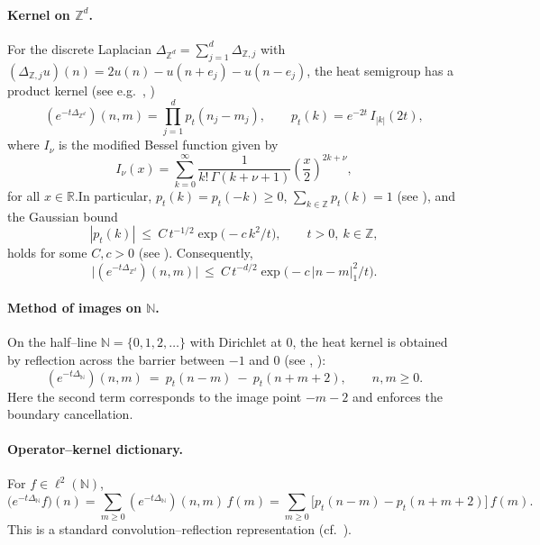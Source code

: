 \documentclass[10pt]{amsart}
\newcommand{\R}{{\mathbb{R}}}
\newcommand{\1}{{\mathbb{I}}}
\numberwithin{equation}{section}
\begin{document}
\paragraph{Kernel on $\mathbb{Z}^d$.}
For the discrete Laplacian $\Delta_{\mathbb{Z}^d}= \sum_{j=1}^d \Delta_{\mathbb{Z},j}$
with $(\Delta_{\mathbb{Z},j} u)(n)=2u(n)-u(n+e_j)-u(n-e_j)$, the heat semigroup
has a product kernel (see e.g.~\cite[Sec.~I.9]{Spitzer1976}, \cite{LawlerLimic2010})
\[
(e^{-t\Delta_{\mathbb{Z}^d}})(n,m)
= \prod_{j=1}^d p_t(n_j-m_j),
\qquad
p_t(k)=e^{-2t}\,I_{|k|}(2t),
\]
where $I_\nu$ is the modified Bessel function given by \[
I_\nu(x)
= \sum_{k=0}^{\infty}
\frac{1}{k!\,\Gamma(k+\nu+1)}
\left( \frac{x}{2} \right)^{2k+\nu},
\]
for all $x\in\R$.In particular,
$p_t(k)=p_t(-k)\ge0$, $\sum_{k\in\mathbb{Z}}p_t(k)=1$ (see \cite{Woess2000}),
and the Gaussian bound
\begin{equation}\label{eq:pt-Gauss}
|p_t(k)|\ \le\ C\,t^{-1/2}\exp\!\big(-c\,k^2/t\big),\qquad t>0,\ k\in\mathbb{Z},
\end{equation}
holds for some $C,c>0$ (see \cite{CarlenKusuokaStroock1987,Delmotte1999}).
Consequently,
\[
\big|(e^{-t\Delta_{\mathbb{Z}^d}})(n,m)\big|
\ \le\ C\,t^{-d/2}\exp\!\big(-c\,|n-m|_1^2/t\big).
\]

\paragraph{Method of images on $\mathbb{N}$.}
On the half--line $\mathbb{N}=\{0,1,2,\dots\}$ with Dirichlet at $0$, the heat
kernel is obtained by reflection across the barrier between $-1$ and $0$
(see \cite[Sec.~3.3]{Davies1989}, \cite[Prop.~2.2]{CiprianiGrillo2022}):
\begin{equation}\label{eq:HN-1D}
(e^{-t\Delta_{\mathbb{N}}})(n,m)\ =\ p_t(n-m)\ -\ p_t(n+m+2),
\qquad n,m\ge0.
\end{equation}
Here the second term corresponds to the image point $-m-2$ and enforces the
boundary cancellation.

\paragraph{Operator--kernel dictionary.}
For $f\in\ell^2(\mathbb{N})$,
\[
\big(e^{-t\Delta_{\mathbb{N}}}f\big)(n)
=\sum_{m\ge0} (e^{-t\Delta_{\mathbb{N}}})(n,m)\,f(m)
=\sum_{m\ge0}\big[p_t(n-m)-p_t(n+m+2)\big]\,f(m).
\]
This is a standard convolution--reflection representation
(cf.~\cite{Woess2000,LawlerLimic2010}).
\end{document}
